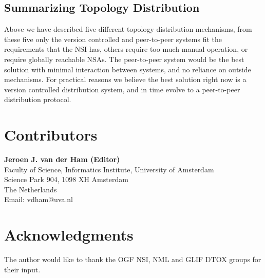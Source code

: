 \documentclass[12pt]{article}  %
\begin{document}
\subsection{Summarizing Topology Distribution}

 Above we have described five different topology distribution mechanisms, 
from these five only the version controlled and peer-to-peer systems fit the requirements 
that the NSI has, others require too much manual operation, or require globally 
reachable NSAs. The peer-to-peer system would be the best solution with minimal 
interaction between systems, and no reliance on outside mechanisms. For practical 
reasons we believe the best solution right now is a version controlled distribution 
system, and in time evolve to a peer-to-peer distribution protocol.\label{h.j5x37xsutbrh}

\section{Contributors}

% 
% 
% 

\textbf{Jeroen J. van der Ham (Editor)} \\
Faculty of Science, Informatics Institute, University of Amsterdam \\
Science Park 904, 1098 XH  Amsterdam  \\
The Netherlands \\
Email: vdham@uva.nl \\
\section{Acknowledgments}

The author would like to thank the OGF NSI, NML and GLIF DTOX groups for their input.


 
 
\end{document}
